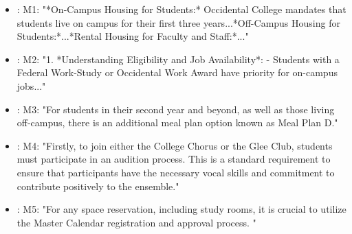 \documentclass[10pt,twocolumn]{article}
\begin{document}
\begin{itemize}
\item: M1: "*On-Campus Housing for Students:*
Occidental College mandates that students live on campus for their first three years...*Off-Campus Housing for Students:*...*Rental Housing for Faculty and Staff:*..."
\item: M2: "1. *Understanding Eligibility and Job Availability*:
- Students with a Federal Work-Study or Occidental Work Award have priority for on-campus jobs..."
\item: M3: "For students in their second year and beyond, as well as those living off-campus, there is an additional meal plan option known as Meal Plan D."
\item: M4: "Firstly, to join either the College Chorus or the Glee Club, students must participate in an audition process. This is a standard requirement to ensure that participants have the necessary vocal skills and commitment to contribute positively to the ensemble."
\item: M5: "For any space reservation, including study rooms, it is crucial to utilize the Master Calendar registration and approval process. "
\end{itemize}
\end{document}
